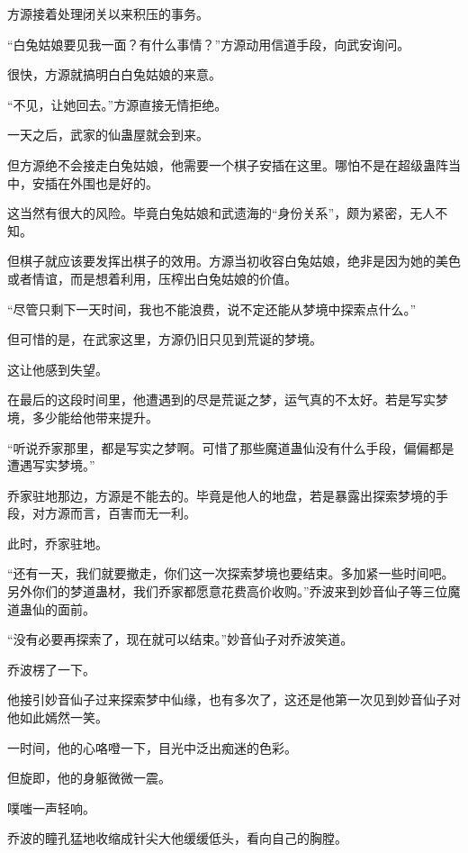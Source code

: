 
\begin{this_body}

方源接着处理闭关以来积压的事务。

“白兔姑娘要见我一面？有什么事情？”方源动用信道手段，向武安询问。

很快，方源就搞明白白兔姑娘的来意。

“不见，让她回去。”方源直接无情拒绝。

一天之后，武家的仙蛊屋就会到来。

但方源绝不会接走白兔姑娘，他需要一个棋子安插在这里。哪怕不是在超级蛊阵当中，安插在外围也是好的。

这当然有很大的风险。毕竟白兔姑娘和武遗海的“身份关系”，颇为紧密，无人不知。

但棋子就应该要发挥出棋子的效用。方源当初收容白兔姑娘，绝非是因为她的美色或者情谊，而是想着利用，压榨出白兔姑娘的价值。

“尽管只剩下一天时间，我也不能浪费，说不定还能从梦境中探索点什么。”

但可惜的是，在武家这里，方源仍旧只见到荒诞的梦境。

这让他感到失望。

在最后的这段时间里，他遭遇到的尽是荒诞之梦，运气真的不太好。若是写实梦境，多少能给他带来提升。

“听说乔家那里，都是写实之梦啊。可惜了那些魔道蛊仙没有什么手段，偏偏都是遭遇写实梦境。”

乔家驻地那边，方源是不能去的。毕竟是他人的地盘，若是暴露出探索梦境的手段，对方源而言，百害而无一利。

此时，乔家驻地。

“还有一天，我们就要撤走，你们这一次探索梦境也要结束。多加紧一些时间吧。另外你们的梦道蛊材，我们乔家都愿意花费高价收购。”乔波来到妙音仙子等三位魔道蛊仙的面前。

“没有必要再探索了，现在就可以结束。”妙音仙子对乔波笑道。

乔波楞了一下。

他接引妙音仙子过来探索梦中仙缘，也有多次了，这还是他第一次见到妙音仙子对他如此嫣然一笑。

一时间，他的心咯噔一下，目光中泛出痴迷的色彩。

但旋即，他的身躯微微一震。

噗嗤一声轻响。

乔波的瞳孔猛地收缩成针尖大他缓缓低头，看向自己的胸膛。


\end{this_body}
